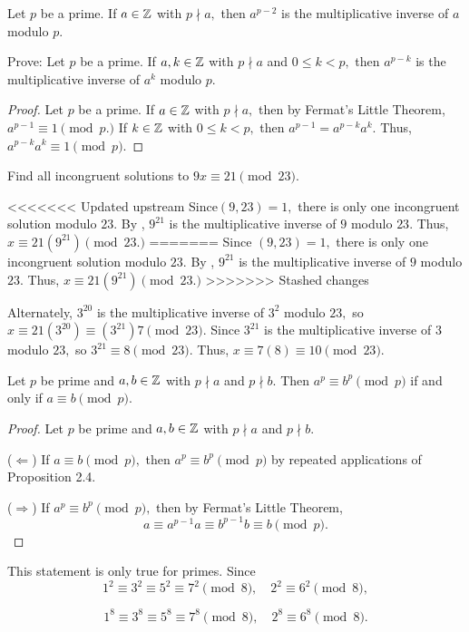 \documentclass{ximera}
\begin{document}
\begin{corollary}\label{cor:inv-fermat}
  Let $p$ be a prime. If $a\in\mathbb Z$ with $p\nmid a,$ then $a^{p-2}$  is the multiplicative inverse of $a$ modulo $p$.
\end{corollary}

\begin{tps} Prove:
  Let $p$ be a prime. If $a,k\in\mathbb Z$ with $p\nmid a$ and $0\leq k<p,$ then $a^{p-k}$  is the multiplicative inverse of $a^k$ modulo $p$.
  
  
  \begin{proof}
    Let $p$ be a prime. If $a\in\mathbb Z$ with $p\nmid a,$ then by Fermat's Little Theorem, $a^{p-1}\equiv 1\pmod{p.}$ If $k\in\mathbb Z$ with $0\leq k<p,$ then $a^{p-1}=a^{p-k}a^k.$ Thus, $a^{p-k}a^k\equiv 1\pmod{p}.$
  \end{proof}
\end{tps}

\begin{example}
  Find all incongruent solutions to $9x\equiv 21\pmod{23}$.
  
<<<<<<< Updated upstream
  Since$(9,23)=1,$ there is only one  incongruent solution  modulo $23.$ By , $9^{21}$ is the multiplicative inverse of $9$ modulo ${23}$. Thus, $x\equiv 21(9^{21})\pmod{23.}$
=======
  Since $(9,23)=1,$ there is only one  incongruent solution  modulo $23.$ By , $9^{21}$ is the multiplicative inverse of $9$ modulo ${23}$. Thus, $x\equiv 21(9^{21})\pmod{23.}$
>>>>>>> Stashed changes

  Alternately, $3^{20}$ is the multiplicative inverse of $3^2$ modulo ${23},$ so $x\equiv 21(3^{20})\equiv  (3^{21})7\pmod{23}.$ Since $3^{21}$ is the multiplicative inverse of $3$ modulo $23,$ so $3^{21}\equiv 8\pmod{23}.$ Thus, $x\equiv 7(8)\equiv 10\pmod{23}.$
\end{example}

\begin{example}
  Let $p$ be prime and $a,b\in\mathbb Z$ with $p\nmid a$ and $p\nmid b.$ Then $a^p\equiv b^p\pmod{p}$ if and only if $a\equiv b\pmod{p}$.
  
  
  \begin{proof}
    Let $p$ be prime and $a,b\in\mathbb Z$ with $p\nmid a$ and $p\nmid b.$ 
      
    ($\Leftarrow$) If $a\equiv  b\pmod{p},$ then $a^p\equiv b^p\pmod{p}$ by repeated applications of Proposition 2.4.
      
    ($\Rightarrow$)  If $a^p\equiv  b^p\pmod{p},$ then by Fermat's Little Theorem, 
      \[a\equiv a^{p-1}a\equiv b^{p-1}b\equiv b\pmod p. \]
  \end{proof}
  \begin{warning}
    This statement is only true for primes. Since
    \[
    1^2\equiv 3^2\equiv 5^2\equiv 7^2\pmod{8},\quad 2^2\equiv 6^2\pmod{8},
    \]
    
    \[
    1^8\equiv 3^8\equiv 5^8\equiv 7^8\pmod{8},\quad  2^8\equiv 6^8\pmod{8}.
    \]
  \end{warning}
\end{example}
\end{document}
